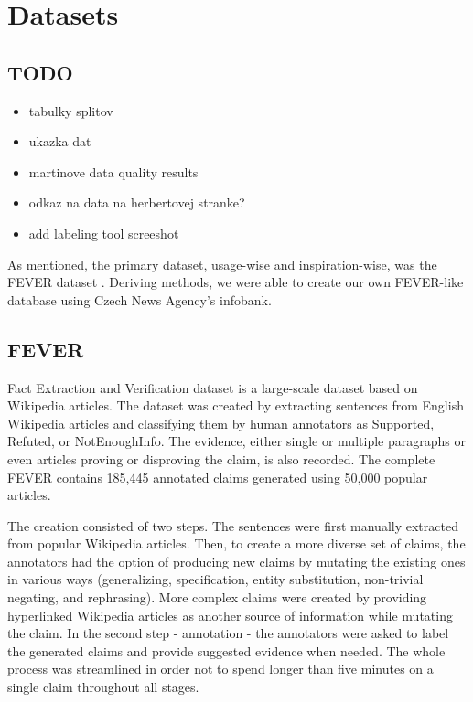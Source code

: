 \chapter{Datasets}
\label{chap:data}

\section{TODO}

\begin{itemize}
    \item tabulky splitov
    \item ukazka dat
    \item martinove data quality results
    \item odkaz na data na herbertovej stranke?
    \item add labeling tool screeshot
\end{itemize}

As mentioned, the primary dataset, usage-wise and inspiration-wise, was the FEVER dataset \citep{fever}.
Deriving \cite{fever} methods, we \citep{ullrich} were able to create our own FEVER-like database using Czech News Agency's infobank.

\section{FEVER}

Fact Extraction and Verification \citep{fever} dataset is a large-scale dataset based on Wikipedia articles.
The dataset was created by extracting sentences from English Wikipedia articles and classifying them by human annotators as Supported, Refuted, or NotEnoughInfo.
The evidence, either single or multiple paragraphs or even articles proving or disproving the claim, is also recorded.
The complete FEVER contains 185,445 annotated claims generated using 50,000 popular articles.

The creation consisted of two steps. The sentences were first manually extracted from popular Wikipedia articles.
Then, to create a more diverse set of claims, the annotators had the option of producing new claims by mutating the existing ones in various ways (generalizing, specification, entity substitution, non-trivial negating, and rephrasing).
More complex claims were created by providing hyperlinked Wikipedia articles as another source of information while mutating the claim.
In the second step - annotation - the annotators were asked to label the generated claims and provide suggested evidence when needed.
The whole process was streamlined in order not to spend longer than five minutes on a single claim throughout all stages.

